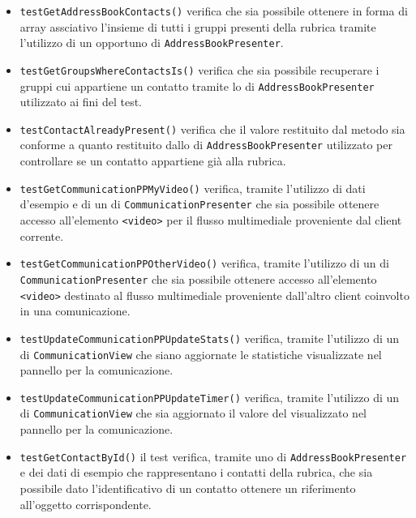 \begin{itemize}
\begin{itemize}
\item \texttt{testGetAddressBookContacts()} verifica che sia possibile ottenere in forma di array assciativo l'insieme di tutti i gruppi presenti della rubrica tramite l'utilizzo di un opportuno  di \verb'AddressBookPresenter'.

\item \texttt{testGetGroupsWhereContactsIs()} verifica che sia possibile recuperare i gruppi cui appartiene un contatto tramite lo  di \verb'AddressBookPresenter' utilizzato ai fini del test.

\item \texttt{testContactAlreadyPresent()} verifica che il valore restituito dal metodo sia conforme a quanto restituito dallo  di \verb'AddressBookPresenter' utilizzato per controllare se un contatto appartiene già alla rubrica.

\item \texttt{testGetCommunicationPPMyVideo()} verifica, tramite l'utilizzo di dati d'esempio e di un  di \verb'CommunicationPresenter' che sia possibile ottenere accesso all'elemento \verb'<video>' per il flusso multimediale proveniente dal client corrente.

\item \texttt{testGetCommunicationPPOtherVideo()} verifica, tramite l'utilizzo di un  di \verb'CommunicationPresenter' che sia possibile ottenere accesso all'elemento \verb'<video>' destinato al flusso multimediale proveniente dall'altro client coinvolto in una comunicazione.

\item \texttt{testUpdateCommunicationPPUpdateStats()} verifica, tramite l'utilizzo di un  di \verb'CommunicationView' che siano aggiornate le statistiche visualizzate nel pannello per la comunicazione.

\item \texttt{testUpdateCommunicationPPUpdateTimer()} verifica, tramite l'utilizzo di un  di \verb'CommunicationView' che sia aggiornato il valore del  visualizzato nel pannello per la comunicazione.

\item \texttt{testGetContactById()} il test verifica, tramite uno  di \verb'AddressBookPresenter' e dei dati di esempio che rappresentano i contatti della rubrica, che sia possibile dato l'identificativo di un contatto ottenere un riferimento all'oggetto corrispondente.


\end{itemize}
\end{itemize}
